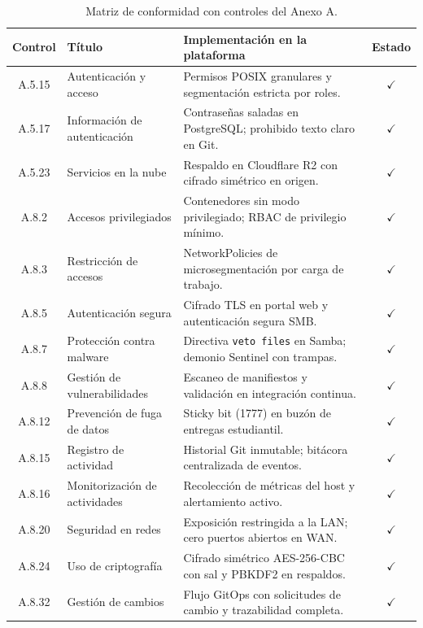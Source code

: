 \documentclass[10pt,a4paper]{article}
\begin{document}
\begin{table}[htbp]
\centering
\small
\caption{Matriz de conformidad con controles del Anexo A.}
\label{tab:iso27001}
\begin{tabular}{|c|p{4cm}|p{8.5cm}|c|}
\hline
\textbf{\textsf{Control}} & \textbf{\textsf{Título}} & \textbf{\textsf{Implementación en la plataforma}} & \textbf{\textsf{Estado}} \\
\hline
A.5.15 & Autenticación y acceso & Permisos POSIX granulares y segmentación estricta por roles. & $\checkmark$ \\
\hline
A.5.17 & Información de autenticación & Contraseñas saladas en PostgreSQL; prohibido texto claro en Git. & $\checkmark$ \\
\hline
A.5.23 & Servicios en la nube & Respaldo en Cloudflare R2 con cifrado simétrico en origen. & $\checkmark$ \\
\hline
A.8.2 & Accesos privilegiados & Contenedores sin modo privilegiado; RBAC de privilegio mínimo. & $\checkmark$ \\
\hline
A.8.3 & Restricción de accesos & NetworkPolicies de microsegmentación por carga de trabajo. & $\checkmark$ \\
\hline
A.8.5 & Autenticación segura & Cifrado TLS en portal web y autenticación segura SMB. & $\checkmark$ \\
\hline
A.8.7 & Protección contra malware & Directiva \texttt{veto files} en Samba; demonio Sentinel con trampas. & $\checkmark$ \\
\hline
A.8.8 & Gestión de vulnerabilidades & Escaneo de manifiestos y validación en integración continua. & $\checkmark$ \\
\hline
A.8.12 & Prevención de fuga de datos & Sticky bit (1777) en buzón de entregas estudiantil. & $\checkmark$ \\
\hline
A.8.15 & Registro de actividad & Historial Git inmutable; bitácora centralizada de eventos. & $\checkmark$ \\
\hline
A.8.16 & Monitorización de actividades & Recolección de métricas del host y alertamiento activo. & $\checkmark$ \\
\hline
A.8.20 & Seguridad en redes & Exposición restringida a la LAN; cero puertos abiertos en WAN. & $\checkmark$ \\
\hline
A.8.24 & Uso de criptografía & Cifrado simétrico AES-256-CBC con sal y PBKDF2 en respaldos. & $\checkmark$ \\
\hline
A.8.32 & Gestión de cambios & Flujo GitOps con solicitudes de cambio y trazabilidad completa. & $\checkmark$ \\
\hline
\end{tabular}
\end{table}
\end{document}
